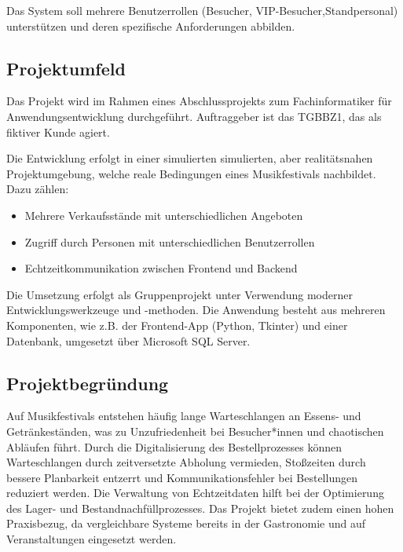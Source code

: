 Das System soll mehrere Benutzerrollen (Besucher, \acs{VIP}-Besucher,Standpersonal) unterstützen und
deren spezifische Anforderungen abbilden.

\subsection{Projektumfeld} 
\label{sec:Projektumfeld}
Das Projekt wird im Rahmen eines Abschlussprojekts zum Fachinformatiker für
Anwendungsentwicklung durchgeführt. Auftraggeber ist das TGBBZ1, das als fiktiver
Kunde agiert.

Die Entwicklung erfolgt in einer simulierten simulierten, aber realitätsnahen Projektumgebung, welche reale Bedingungen
eines Musikfestivals nachbildet. Dazu zählen:

\begin{itemize}
    \item Mehrere Verkaufsstände mit unterschiedlichen Angeboten
    \item Zugriff durch Personen mit unterschiedlichen Benutzerrollen
    \item Echtzeitkommunikation zwischen Frontend und Backend
\end{itemize}

Die Umsetzung erfolgt als Gruppenprojekt unter Verwendung moderner Entwicklungswerkzeuge
und -methoden. Die Anwendung besteht aus mehreren Komponenten, wie z.B. der Frontend-App
(Python, Tkinter) und einer Datenbank, umgesetzt über Microsoft SQL Server.

\subsection{Projektbegründung} 
\label{sec:Projektbegründung}
Auf Musikfestivals entstehen häufig lange Warteschlangen an Essens- und Getränkeständen,
was zu Unzufriedenheit bei Besucher*innen und chaotischen Abläufen führt.
Durch die Digitalisierung des Bestellprozesses können Warteschlangen durch zeitversetzte
Abholung vermieden, Stoßzeiten durch bessere Planbarkeit entzerrt und Kommunikationsfehler
bei Bestellungen reduziert werden. Die Verwaltung von Echtzeitdaten hilft bei der Optimierung
des Lager- und Bestandnachfüllprozesses.
Das Projekt bietet zudem einen hohen Praxisbezug, da vergleichbare Systeme bereits
in der Gastronomie und auf Veranstaltungen eingesetzt werden.